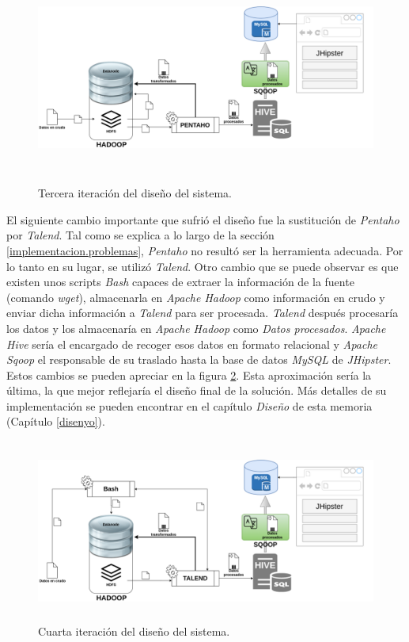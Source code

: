 \begin{figure}[H]
    \centering
    \includegraphics[width=1\textwidth,height=7cm]{Imagenes/Dis_Fig_3}
    \caption{Tercera iteración del diseño del sistema.}
    \label{fig:dis_3_sist}
\end{figure}
\par

El siguiente cambio importante que sufrió el diseño fue la sustitución de \textit{Pentaho} por \textit{Talend}. Tal como se explica a lo largo de la sección \ref{implementacion.problemas}, \textit{Pentaho} no resultó ser la herramienta adecuada. Por lo tanto en su lugar, se utilizó \textit{Talend}. Otro cambio que se puede observar es que existen unos scripts \textit{Bash} capaces de extraer la información de la fuente (comando \textit{wget}), almacenarla en \textit{Apache Hadoop} como información en crudo y enviar dicha información a \textit{Talend} para ser procesada. 
\textit{Talend} después procesaría los datos y los almacenaría en \textit{Apache Hadoop} como \textit{Datos procesados}. \textit{Apache Hive} sería el encargado de recoger esos datos en formato relacional y \textit{Apache Sqoop} el responsable de su traslado hasta la base de datos \textit{MySQL} de \textit{JHipster}. Estos cambios se pueden apreciar en la figura \ref{fig:dis_4_sist}. Esta aproximación sería la última, la que mejor reflejaría el diseño final de la solución. Más detalles de su implementación se pueden encontrar en el capítulo \textit{Diseño} de esta memoria (Capítulo \ref{disenyo}).

\begin{figure}[H]
    \centering
    \includegraphics[width=1\textwidth,height=6cm]{Imagenes/Dis_Fig_4}
    \caption{Cuarta iteración del diseño del sistema.}
    \label{fig:dis_4_sist}
\end{figure}